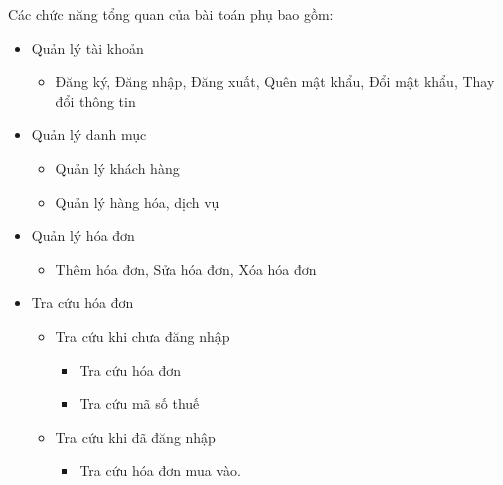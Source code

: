Các chức năng tổng quan của bài toán phụ bao gồm:

\begin{itemize}

\item Quản lý tài khoản

\begin{itemize}

\item Đăng ký, Đăng nhập, Đăng xuất, Quên mật khẩu, Đổi mật khẩu, Thay đổi thông tin

\end{itemize}

\item Quản lý danh mục

\begin{itemize}

\item Quản lý khách hàng

\item Quản lý hàng hóa, dịch vụ

\end{itemize}

\item Quản lý hóa đơn

\begin{itemize}

\item Thêm hóa đơn, Sửa hóa đơn, Xóa hóa đơn

\end{itemize}

\item Tra cứu hóa đơn

\begin{itemize}

\item Tra cứu khi chưa đăng nhập

\begin{itemize}

\item Tra cứu hóa đơn

\item Tra cứu mã số thuế

\end{itemize}

\item Tra cứu khi đã đăng nhập

\begin{itemize}

\item Tra cứu hóa đơn mua vào.


\end{itemize}
\end{itemize}
\end{itemize}
